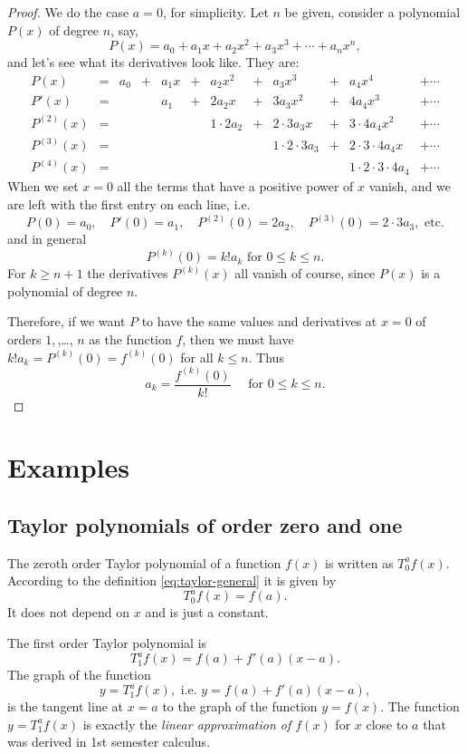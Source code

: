 \begin{proof} 
  We do the case $a=0$, for simplicity.  Let $n$ be given, consider a polynomial
  $P(x)$ of degree $n$, say,
  \[
  P(x) = a_0 + a_1 x + a_2 x^2 + a_3 x^3 +\cdots + a_n x^n,
  \]
  and let's see what its derivatives look like. They are:
  \[
  \begin{array}{cccccccccccccc}
    P(x)  &=& a_0 & + & a_1x & + & a_2 x^2 & + & a_3x^3 & + &a_4x^4 &+\cdots \\
    P'(x) &=&     &   & a_1  & + & 2a_2 x  & + & 3a_3x^2& + &4a_4x^3&+\cdots \\
    P^{(2)}(x)
    &=&  & & & & 1\cdot2a_2 & + & 2\cdot3a_3x& + &3\cdot4a_4x^2&+\cdots \\
    P^{(3)}(x)&=&  & & & & & & 1\cdot2\cdot3a_3& + &2\cdot3\cdot4a_4x&+\cdots \\
    P^{(4)}(x)&=&  & & & & & & & &1\cdot2\cdot3\cdot4a_4&+\cdots 
  \end{array}
  \]
  When we set $x=0$ all the terms that have a positive power of $x$
  vanish, and we are left with the first entry on each line, i.e.
  \[
  P(0) = a_0, \quad P'(0) = a_1, \quad P^{(2)} (0) = 2a_2, \quad P^{(3)}
  (0) = 2\cdot3a_3, \text { etc.}
  \]
  and in general
  \[
  P^{(k)} (0) = k! a_k \text{ for }0\leq k\leq n.
  \]
  For $k\geq n+1$ the derivatives $P^{(k)} (x)$ all vanish of course, since
  $P (x)$ is a polynomial of degree $n$.

  Therefore, if we want $P$ to have the same values and derivatives at
  $x=0$ of orders $1,$,\ldots, $n$ as the function $f$, then we must have
  $k!a_k = P^{(k)} (0) = f^{(k)} (0)$ for all $k\leq n$. Thus
  \[
  a_k = \frac {f^{(k)} (0)}{k!} \quad\text{ for }0\leq k\leq n.
  \]
\end{proof}

\section{Examples} %
\subsection{Taylor polynomials of order zero and one} %
The zeroth order Taylor polynomial of a function $f(x)$ is written as
$T^a_0f(x)$.  According to the definition \eqref{eq:taylor-general} it is given
by
\[
T_0^af(x) = f(a).
\]
It does not depend on $x$ and is just a constant.

The first order Taylor polynomial is
\[
T_1^af(x) = f(a) + f'(a) (x-a).
\]
The graph of the function 
\[
  y= T_1^af(x), \text{ i.e. } y = f(a) + f'(a) (x-a),
\]
is the tangent line at $x=a$ to the graph of the function $y=f(x)$.
The function $y=T_1^af(x)$ is exactly the \textit{linear approximation of
$f(x)$} for $x$ close to $a$ that was derived in 1st semester calculus.

